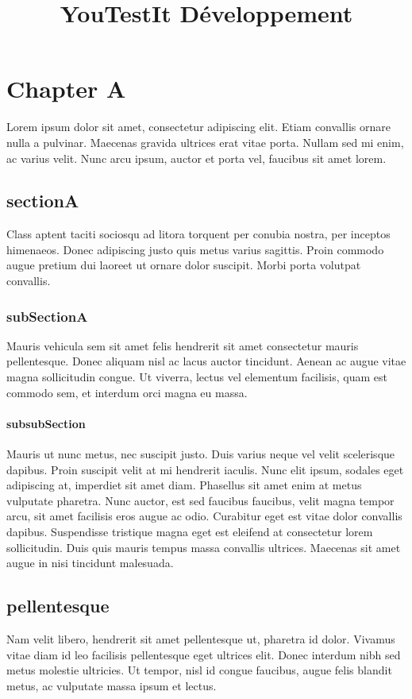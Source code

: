 \documentclass[10pt]{smile}
\title{YouTestIt Développement}
\begin{document}
\makefront


\chapter{Chapter A}

Lorem ipsum dolor sit amet, consectetur adipiscing elit. Etiam convallis ornare nulla a pulvinar. Maecenas gravida ultrices erat vitae porta. Nullam sed mi enim, ac varius velit. Nunc arcu ipsum, auctor et porta vel, faucibus sit amet lorem.

\section{sectionA}
Class aptent taciti sociosqu ad litora torquent per conubia nostra, per inceptos himenaeos. Donec adipiscing justo quis metus varius sagittis. Proin commodo augue pretium dui laoreet ut ornare dolor suscipit. Morbi porta volutpat convallis.

\subsection{subSectionA}
Mauris vehicula sem sit amet felis hendrerit sit amet consectetur mauris pellentesque. Donec aliquam nisl ac lacus auctor tincidunt. Aenean ac augue vitae magna sollicitudin congue. Ut viverra, lectus vel elementum facilisis, quam est commodo sem, et interdum orci magna eu massa.
		
\subsubsection{subsubSection}
Mauris ut nunc metus, nec suscipit justo. Duis varius neque vel velit scelerisque dapibus. Proin suscipit velit at mi hendrerit iaculis. Nunc elit ipsum, sodales eget adipiscing at, imperdiet sit amet diam. Phasellus sit amet enim at metus vulputate pharetra. Nunc auctor, est sed faucibus faucibus, velit magna tempor arcu, sit amet facilisis eros augue ac odio. Curabitur eget est vitae dolor convallis dapibus. Suspendisse tristique magna eget est eleifend at consectetur lorem sollicitudin. Duis quis mauris tempus massa convallis ultrices. Maecenas sit amet augue in nisi tincidunt malesuada.

\section{pellentesque}
Nam velit libero, hendrerit sit amet pellentesque ut, pharetra id dolor. Vivamus vitae diam id leo facilisis pellentesque eget ultrices elit. Donec interdum nibh sed metus molestie ultricies. Ut tempor, nisl id congue faucibus, augue felis blandit metus, ac vulputate massa ipsum et lectus.
\end{document}
